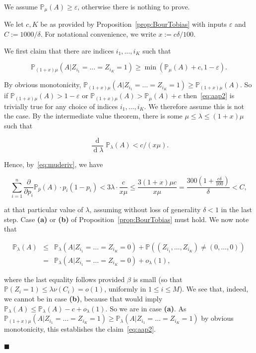 \documentclass[11pt]{article}%
\newenvironment{proof}{\vspace{1ex}\noindent{\bf Proof.}}{\hspace*{\fill}$\blacksquare$\vspace{1ex}}
\newcommand{\Pee}[0]{\ensuremath{{\mathbb P}}}
\newcommand{\eps}{\varepsilon}
\DeclareMathOperator{\dd}{d}
\begin{document}
\begin{proof}
We assume $\Pee_\mu(A) \geq \eps$, otherwise there is nothing to prove.

We let $c, K$ be as provided by Proposition~\ref{prop:BourTobias}
with inputs $\eps$ and $C := 1000/\delta$. %
For notational convenience, we write $x := c\delta/100$.

We first claim that there are indices $i_1,\dots,i_K$ such that 

\begin{equation}\label{eq:aap2} 
\Pee_{(1+x)\mu}(A|Z_{i_1}=\dots=Z_{i_K}=1 ) \geq \min\left( \Pee_{\mu}(A)+c, 1-\eps \right).
\end{equation}

By obvious monotonicity, $\Pee_{(1+x)\mu}(A|Z_{i_1}=\dots=Z_{i_K}=1 ) \geq \Pee_{(1+x)\mu}(A)$.
So if $\Pee_{(1+x)\mu}(A) > 1-\eps$ or $\Pee_{(1+x)\mu}(A) > \Pee_{\mu}(A)+c$ then~\eqref{eq:aap2} is trivially true
for any choice of indices $i_1,\dots,i_K$. 
We therefore assume this is not the case.
By the intermediate value theorem, there is some $\mu \leq \lambda \leq (1+x)\mu$ such that 

$$\frac{\dd}{\dd\lambda} \Pee_\lambda ( A ) < c/(x\mu). $$

\noindent
Hence, by~\eqref{eq:muderiv}, we have 

$$ \sum_{i=1}^n \frac{\partial}{\partial p_i} \Pee_{\overline{p}}( A )  \cdot p_i(1-p_i) < 
3\lambda \cdot \frac{c}{x\mu} \leq \frac{3(1+x)\mu c}{x\mu}
= \frac{300(1+\frac{c\delta}{100})}{\delta} < C, $$

\noindent
at that particular value of $\lambda$, assuming without loss of generality $\delta < 1$ in the last step.
Case {\bf(a)} or {\bf(b)} of Proposition~\ref{prop:BourTobias} must hold. 
We now note that 

$$ \begin{array}{rcl} \Pee_{\lambda}( A ) 
& \leq & \Pee_{\lambda}( A | Z_{i_1}=\dots=Z_{i_K}=0) + 
\Pee( (Z_{i_1},\dots,Z_{i_K})\neq (0,\dots, 0) ) \\
& = & \Pee_{\lambda}( A | Z_{i_1}=\dots=Z_{i_K}=0) + o_\lambda(1), 
\end{array} $$

\noindent 
where the last equality follows provided $\beta$ is small 
(so that $\Pee( Z_i = 1 ) \leq \lambda \nu(C_i) = o(1)$, uniformly in $1\leq i\leq M$).
We see that, indeed, we cannot be in case {\bf(b)}, 
because that would imply $\Pee_{\lambda}( A )  \leq \Pee_{\lambda}( A )  - c + o_\lambda(1)$.
So we are in case {\bf(a)}.
As $\Pee_{(1+x)\mu}( A | Z_{i_1}=\dots=Z_{i_K}=1) \geq 
\Pee_{\lambda}( A | Z_{i_1}=\dots=Z_{i_K}=1)$ by obvious monotonicity, this establishes the claim~\eqref{eq:aap2}.


\end{proof}
\end{document}
